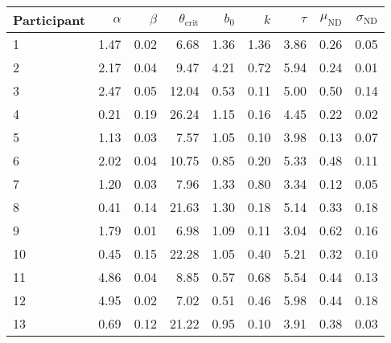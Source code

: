 \begin{tabular}{lrrrrrrrr}
\toprule
Participant &  $\alpha$ &  $\beta$ &  $\theta_{\textrm{crit}}$ &  $b_0$ &  $k$ &  $\tau$ &  $\mu_{\textrm{ND}}$ &  $\sigma_{\textrm{ND}}$ \\
\midrule
          1 &      1.47 &     0.02 &                      6.68 &   1.36 & 1.36 &    3.86 &                 0.26 &                    0.05 \\
          2 &      2.17 &     0.04 &                      9.47 &   4.21 & 0.72 &    5.94 &                 0.24 &                    0.01 \\
          3 &      2.47 &     0.05 &                     12.04 &   0.53 & 0.11 &    5.00 &                 0.50 &                    0.14 \\
          4 &      0.21 &     0.19 &                     26.24 &   1.15 & 0.16 &    4.45 &                 0.22 &                    0.02 \\
          5 &      1.13 &     0.03 &                      7.57 &   1.05 & 0.10 &    3.98 &                 0.13 &                    0.07 \\
          6 &      2.02 &     0.04 &                     10.75 &   0.85 & 0.20 &    5.33 &                 0.48 &                    0.11 \\
          7 &      1.20 &     0.03 &                      7.96 &   1.33 & 0.80 &    3.34 &                 0.12 &                    0.05 \\
          8 &      0.41 &     0.14 &                     21.63 &   1.30 & 0.18 &    5.14 &                 0.33 &                    0.18 \\
          9 &      1.79 &     0.01 &                      6.98 &   1.09 & 0.11 &    3.04 &                 0.62 &                    0.16 \\
         10 &      0.45 &     0.15 &                     22.28 &   1.05 & 0.40 &    5.21 &                 0.32 &                    0.10 \\
         11 &      4.86 &     0.04 &                      8.85 &   0.57 & 0.68 &    5.54 &                 0.44 &                    0.13 \\
         12 &      4.95 &     0.02 &                      7.02 &   0.51 & 0.46 &    5.98 &                 0.44 &                    0.18 \\
         13 &      0.69 &     0.12 &                     21.22 &   0.95 & 0.10 &    3.91 &                 0.38 &                    0.03 \\

\end{tabular}
